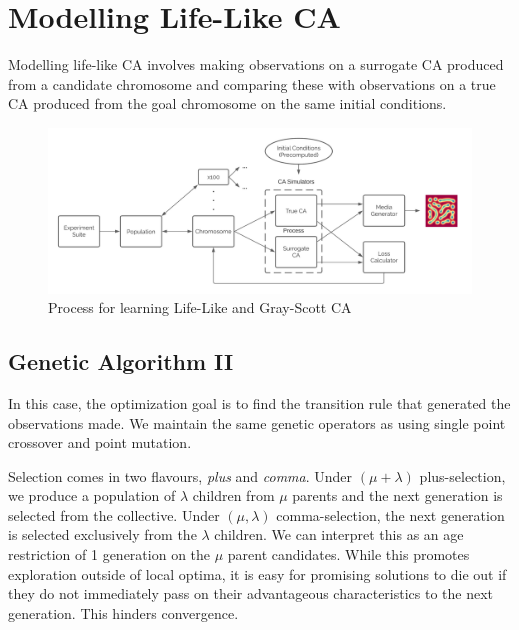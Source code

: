 \chapter{Modelling Life-Like CA} \label{lifelike}

Modelling life-like CA involves making observations on a surrogate CA produced from a candidate chromosome and comparing these with observations on a true CA produced from the goal chromosome on the same initial conditions.

\begin{figure}[!h]
\centering
    \includegraphics[width=\textwidth]{images/dataflow.png}
    \caption{Process for learning Life-Like and Gray-Scott CA}
\label{fig:dataflow}
\end{figure}

\section{Genetic Algorithm II} \label{sec:ga-2}

In this case, the optimization goal is to find the transition rule that generated the observations made. We maintain the same genetic operators as  using single point crossover and point mutation.

Selection comes in two flavours, \textit{plus} and \textit{comma}. Under  $(\mu + \lambda)$ plus-selection, we produce a population of $\lambda$ children from $\mu$ parents and the next generation is selected from the collective. Under $(\mu, \lambda)$ comma-selection, the next generation is selected exclusively from the $\lambda$ children. We can interpret this as an age restriction of 1 generation on the $\mu$ parent candidates. While this promotes exploration outside of local optima, it is easy for promising solutions to die out if they do not immediately pass on their advantageous characteristics to the next generation. This hinders convergence.\\

